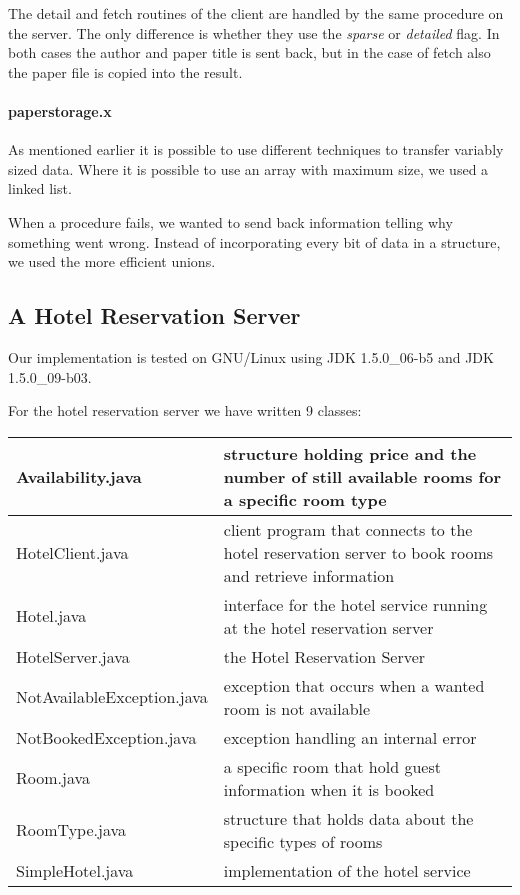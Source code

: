 \documentclass[a4paper,10pt]{article}
\begin{document}
The detail and fetch routines of the client are handled by the same procedure on the server. The only difference is whether they use the \emph{sparse} or \emph{detailed} flag. In both cases the author and paper title is sent back, but in the case of fetch also the paper file is copied into the result.

\paragraph{paperstorage.x}
As mentioned earlier it is possible to use different techniques to transfer variably sized data. Where it is possible to use an array with maximum size, we used a linked list.

When a procedure fails, we wanted to send back information telling why something went wrong. Instead of incorporating every bit of data in a structure, we used the more efficient unions.

\subsection{A Hotel Reservation Server}
Our implementation is tested on GNU/Linux using JDK 1.5.0\_06-b5 and JDK 1.5.0\_09-b03.

For the hotel reservation server we have written 9 classes:
\begin{center}
\begin{tabular}{ l | p{7.0cm} }
Availability.java & structure holding price and the number of still available rooms for a specific room type\\ \hline
HotelClient.java & client program that connects to the hotel reservation server to book rooms and retrieve information\\ \hline
Hotel.java & interface for the hotel service running at the hotel reservation server\\ \hline
HotelServer.java & the Hotel Reservation Server\\ \hline
NotAvailableException.java & exception that occurs when a wanted room is not available\\ \hline
NotBookedException.java & exception handling an internal error\\ \hline
Room.java & a specific room that hold guest information when it is booked\\ \hline
RoomType.java & structure that holds data about the specific types of rooms\\ \hline
SimpleHotel.java & implementation of the hotel service\\
\end{tabular}
\end{center}
\end{document}
